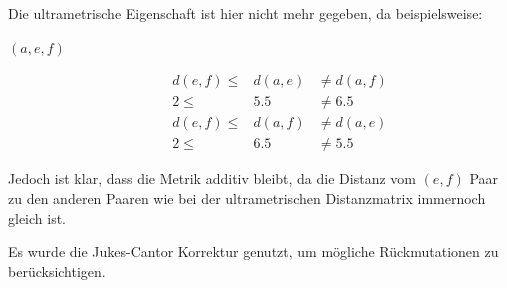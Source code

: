 \documentclass{homework}
\begin{document}
\begin{enumerate}
\begin{enumerate}
Die ultrametrische Eigenschaft ist hier nicht mehr gegeben, da beispielsweise:
\begin{description}
\item[$(a,e,f)$] \begin{eqnarray*}
d(e,f) \leq & d(a,e) & \neq d(a,f)\\
2 \leq & 5.5 & \neq 6.5\\
d(e,f) \leq & d(a,f) & \neq d(a,e)\\
2 \leq & 6.5 & \neq 5.5
\end{eqnarray*}
\end{description}
Jedoch ist klar, dass die Metrik additiv bleibt, da die Distanz vom $(e,f)$ Paar
zu den anderen Paaren wie bei der ultrametrischen Distanzmatrix immernoch gleich
ist.
\end{enumerate}


Es wurde die Jukes-Cantor Korrektur genutzt, um mögliche Rückmutationen zu berücksichtigen.


\end{enumerate}
\end{document}
